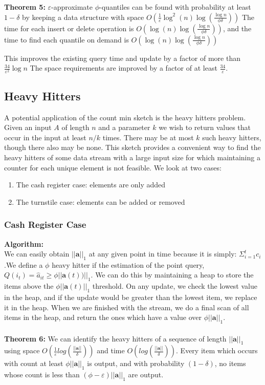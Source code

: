 \documentclass[11pt]{article}
\begin{document}
{\textbf{Theorem 5:} $\varepsilon$-approximate $\phi$-quantiles can be found with probability at least
$1 - \delta$ by keeping a data structure with space $O\left(\frac{1}{\varepsilon}
\log^2(n) \log \left(\frac{\log n}{\phi \delta}\right)\right)$ The time for each insert or delete operation is
$O\left(\log(n) \log \left(\frac{\log n}{\phi \delta}\right)\right)$, and the time to find each quantile on demand 
is $O\left(\log(n)\log\left(\frac{\log n}{\phi \delta}\right)\right)$

This improves the existing query time and update by a factor of more than $\frac{34}{\varepsilon^2} \log n$
The space requirements are improved by a factor of at least $\frac{34}{\varepsilon}$. 

\subsection{Heavy Hitters}
A potential application of the count min sketch is the heavy hitters problem. Given an input $A$ of length $n$ and a parameter $k$ we wish to return values that occur in the input at least $n/k$ times. There may be at most $k$ such heavy hitters, though there also may be none. This sketch provides a convenient way to find the heavy hitters of some data stream with a large input size for which  maintaining a counter for each unique element is not feasible. We look at two cases:
\begin{enumerate}
\item The cash register case: elements are only added
\item The turnstile case: elements can be added or removed
\end{enumerate}

\subsubsection{Cash Register Case}
\textbf{Algorithm:}\\
We can easily obtain $||\bm{a}||_1$ at any given point in time because it is simply: $\Sigma_{i=1}^t c_i$.We define a $\phi$ heavy hitter if the estimation of the point query, $Q(i_t) =  \hat a_{it} \geq \phi ||\bm{a}(t))||_1$. We can do this by maintaining a heap to store the items above the $\phi||\bm{a}(t)||_1$ threshold. On any update, we check the lowest value in the heap, and if the update would be greater than the lowest item, we replace it in the heap. When we are finished with the stream, we do a final scan of all items in the heap, and return the ones which have a value over $\phi||\bm{a}||_1$.\\\\
\textbf{Theorem 6: } We can identify the heavy hitters of a sequence of length $||\bm{a}||_1$ using space $O(\frac{1}{\varepsilon}log(\frac{||\bm{a}||}{\delta}))$ and time $O(log(\frac{||\bm{a}||}{\delta}))$. Every item which occurs with count at least
$\phi ||\bm{a}||_1$ is output, and with probability $(1-\delta)$, no items whose count is less than $(\phi - \varepsilon)||\bm{a}||_1$ are output.

}
\end{document}
